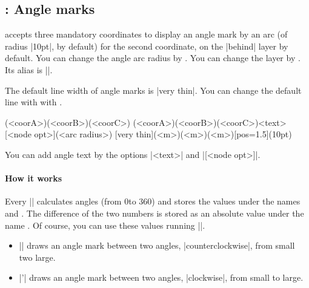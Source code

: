 \subsection{\protect{}: Angle marks}
\label{ss:tzanglemark}

\icmd{\tzanglemark} accepts three mandatory coordinates to display an angle mark by an arc (of radius |10pt|, by default) for the second coordinate, on the |behind| layer by default.
You can change the angle arc radius by \icmd{\settzAAradius}.
You can change the layer by \icmd{\settzanglelayer}. Its alias is |\settzanglemarklayer|.

The default line width of angle marks is |very thin|. You can change the default line with with \icmd{\settzAAlinestyle}.

\begin{tzdef}
\tzanglemark(<coorA>)(<coorB>)(<coorC>)
\tzanglemark[<opt>](<coorA>)(<coorB>)(<coorC>){<text>}[<node opt>](<arc radius>)
  [very thin](<m>)(<m>)(<m>){}[pos=1.5](10pt)
\end{tzdef}

You can add angle text by the options |{<text>}| and |[<node opt>]|.

\begin{tzcode}{.3}
\end{tzcode}

\begin{tzcode}{.3}
{}
\end{tzcode}


\paragraph{How it works} Every |\tzanglemark| calculates angles (from 0\textdegree to 360\textdegree) and stores the values under the names \icmd{\tzangleONE} and \icmd{\tzangleTWO}. The difference of the two numbers is stored as an absolute value under the name \icmd{\tzangleresult}.
Of course, you can use these values  running |\tzanglemark|.
\begin{itemize}\firmlist
\item |\tzanglemark| draws an angle mark between two angles, |counterclockwise|, from small two large.
\item |\tzanglemark'| draws an angle mark between two angles, |clockwise|, from small to large.
\end{itemize}

